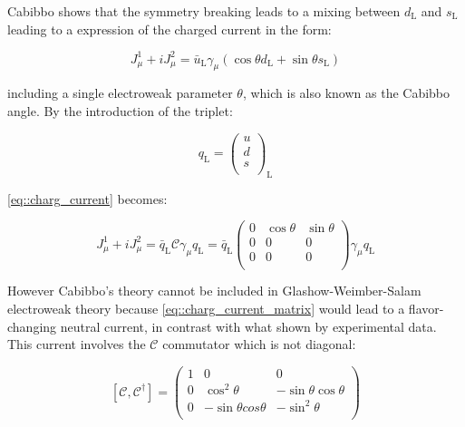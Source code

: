 Cabibbo shows that the symmetry breaking leads to a mixing between $d_{\text{L}}$ and $s_{\text{L}}$ leading to a expression of the charged current in the form:

\begin{equation}
J^{1}_{\mu} + i J^{2}_{\mu}= \bar{u}_{\text{L}}\gamma_{\mu} (\cos\theta d_{\text{L}} +\sin\theta s_{\text{L}})
\label{eq::charg_current}
\end{equation}

including a single electroweak parameter $\theta$, which is also known as the Cabibbo angle. By the introduction of the triplet:

\begin{equation}
q_{\text{L}} = 
\begin{pmatrix}
u \\
d \\
s \\
\end{pmatrix}
_{\text{L}}
\end{equation}

\autoref{eq::charg_current} becomes:

\begin{equation}
J^{1}_{\mu} + i J^{2}_{\mu} = \bar{q}_{\text{L}}\mathcal{C}\gamma_{\mu}q_{\text{L}} =  \bar{q}_{\text{L}}
\begin{pmatrix}
0 &\cos\theta &\sin\theta \\
0 &0 &0 \\
0 &0 &0\\
\end{pmatrix}
\gamma_{\mu}q_{\text{L}}
\label{eq::charg_current_matrix}
\end{equation}

However Cabibbo's theory cannot be included in Glashow-Weimber-Salam electroweak theory because \autoref{eq::charg_current_matrix} would lead to a flavor-changing neutral current, in contrast with what shown by experimental data. This current involves the $\mathcal{C}$ commutator which is not diagonal:

\begin{equation}
\left[\mathcal{C}, \mathcal{C}^{\dagger} \right]
=
\begin{pmatrix}
1 &0 &0 \\
0 &\cos^{2}\theta &-\sin\theta \cos\theta \\
0 &-\sin\theta cos\theta &-\sin^{2}\theta\\
\end{pmatrix}
\end{equation}

